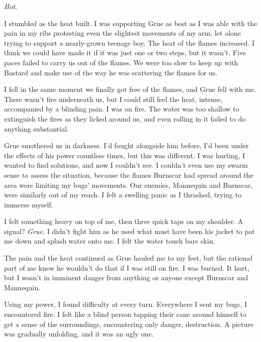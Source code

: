 \emph{Hot}.



I stumbled as the heat built.  I was supporting Grue as best as I was able with the pain in my ribs protesting even the slightest movements of my arm, let alone trying to support a nearly-grown teenage boy.  The heat of the flames increased.  I think we could have made it if it was just one or two steps, but it wasn't.  Five paces failed to carry us out of the flames.  We were too slow to keep up with Bastard and make use of the way he was scattering the flames for us.



I fell in the same moment we finally got free of the flames, and Grue fell with me.  There wasn't fire underneath us, but I could still feel the heat, intense, accompanied by a blinding pain.  I was on fire.  The water was too shallow to extinguish the fires as they licked around us, and even rolling in it failed to do anything substantial.



Grue smothered us in darkness.  I'd fought alongside him before, I'd been under the effects of his power countless times, but this was different.  I was hurting, I wanted to find solutions, and now I couldn't see.  I couldn't even use my swarm sense to assess the situation, because the flames Burnscar had spread around the area were limiting my bugs' movements.  Our enemies, Mannequin and Burnscar, were similarly out of my reach.  I felt a swelling panic as I thrashed, trying to immerse myself.



I felt something heavy on top of me, then three quick taps on my shoulder.  A signal?  \emph{Grue.}  I didn't fight him as he used what must have been his jacket to pat me down and splash water onto me.  I felt the water touch bare skin.



The pain and the heat continued as Grue hauled me to my feet, but the rational part of me knew he wouldn't do that if I was still on fire.  I was burned.  It hurt, but I wasn't in imminent danger from anything or anyone except Burnscar and Mannequin.



Using my power, I found difficulty at every turn.  Everywhere I sent my bugs, I encountered fire.  I felt like a blind person tapping their cane around himself to get a sense of the surroundings, encountering only danger, destruction.  A picture was gradually unfolding, and it was an ugly one.



